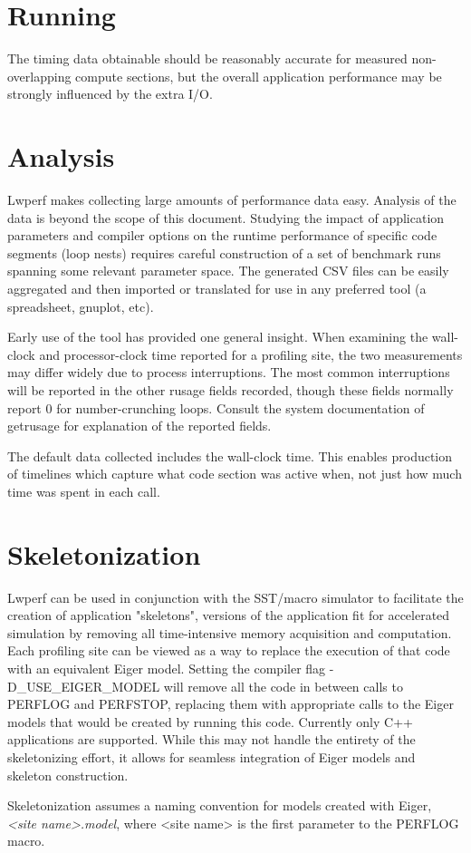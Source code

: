 \documentclass{article}
\begin{document}
\section{Running}
\label{sec:running}
The timing data obtainable should be reasonably accurate for measured non-overlapping compute sections, but the overall application performance may be strongly influenced by the extra I/O.

\section{Analysis}
Lwperf makes collecting large amounts of performance data easy. Analysis of the data is beyond the scope of this document. Studying the impact of application parameters and compiler options on the runtime performance of specific code segments (loop nests) requires careful construction of a set of benchmark runs spanning some relevant parameter space. The generated CSV files can be easily aggregated and then imported or translated for use in any preferred tool (a spreadsheet, gnuplot, etc).

Early use of the tool has provided one general insight. When examining the wall-clock and processor-clock time reported for a profiling site, the two measurements may differ widely due to process interruptions. The most common interruptions will be reported in the other rusage fields recorded, though these fields normally report 0 for number-crunching loops. Consult the system documentation of getrusage for explanation of the reported fields.

The default data collected includes the wall-clock time. This enables production of timelines which capture what code section was active when, not just how much time was spent in each call.

\section{Skeletonization}
Lwperf can be used in conjunction with the SST/macro simulator to facilitate the creation of application "skeletons", versions of the application fit for accelerated simulation by removing all time-intensive memory acquisition and computation. Each profiling site can be viewed as a way to replace the execution of that code with an equivalent Eiger model. Setting the compiler flag -D\_USE\_EIGER\_MODEL will remove all the code in between calls to PERFLOG and PERFSTOP, replacing them with appropriate calls to the Eiger models that would be created by running this code. Currently only C++ applications are supported. While this may not handle the entirety of the skeletonizing effort, it allows for seamless integration of Eiger models and skeleton construction. 

Skeletonization assumes a naming convention for models created with Eiger, \textit{<site name>.model}, where <site name> is the first parameter to the PERFLOG macro.
\end{document}
